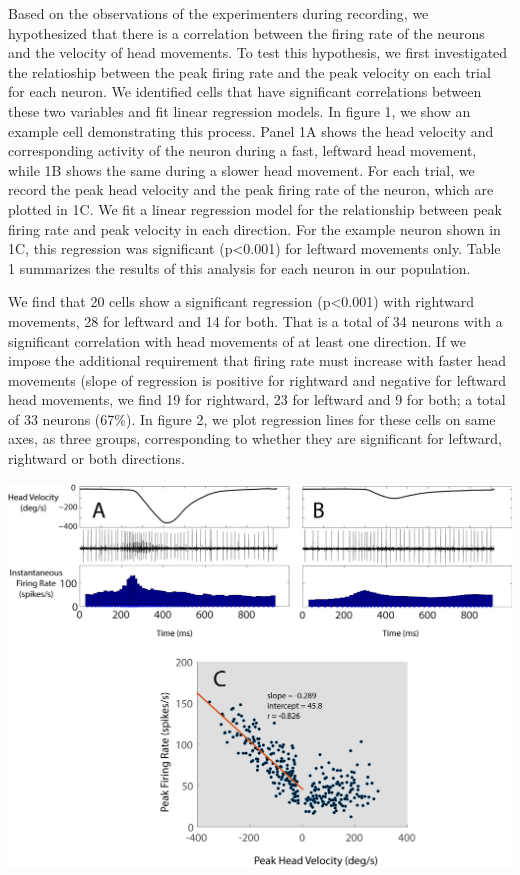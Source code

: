 \documentclass[]{article}
\begin{document}
Based on the observations of the experimenters during recording, we
hypothesized that there is a correlation between the firing rate of the
neurons and the velocity of head movements. To test this hypothesis, we
first investigated the relatioship between the peak firing rate and the
peak velocity on each trial for each neuron. We identified cells that
have significant correlations between these two variables and fit linear
regression models. In figure 1, we show an example cell demonstrating
this process. Panel 1A shows the head velocity and corresponding
activity of the neuron during a fast, leftward head movement, while 1B
shows the same during a slower head movement. For each trial, we record
the peak head velocity and the peak firing rate of the neuron, which are
plotted in 1C. We fit a linear regression model for the relationship
between peak firing rate and peak velocity in each direction. For the
example neuron shown in 1C, this regression was significant
(p\textless{}0.001) for leftward movements only. Table 1 summarizes the
results of this analysis for each neuron in our population.

We find that 20 cells show a significant regression (p\textless{}0.001)
with rightward movements, 28 for leftward and 14 for both. That is a
total of 34 neurons with a significant correlation with head movements
of at least one direction. If we impose the additional requirement that
firing rate must increase with faster head movements (slope of
regression is positive for rightward and negative for leftward head
movements, we find 19 for rightward, 23 for leftward and 9 for both; a
total of 33 neurons (67\%). In figure 2, we plot regression lines for
these cells on same axes, as three groups, corresponding to whether they
are significant for leftward, rightward or both directions.

\includegraphics{Example1sc21dec11.png}
\end{document}
